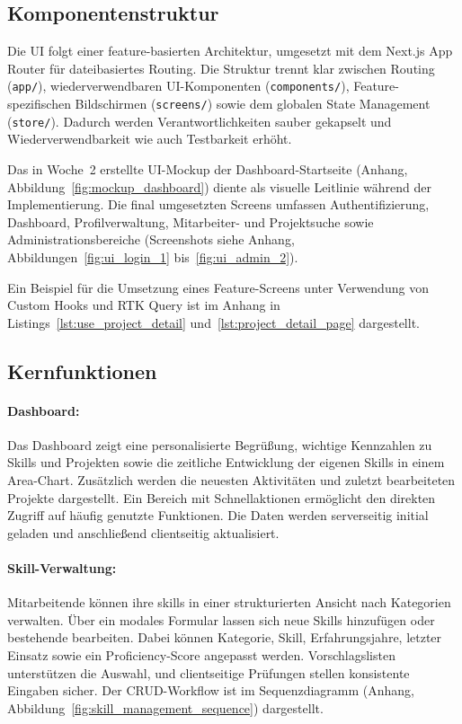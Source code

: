\subsection{Komponentenstruktur}

Die UI folgt einer feature-basierten Architektur\cite{atomic_design}, umgesetzt mit dem Next.js App Router für dateibasiertes Routing. Die Struktur trennt klar zwischen Routing (\texttt{app/}), wiederverwendbaren UI-Komponenten (\texttt{components/}), Feature-spezifischen Bildschirmen (\texttt{screens/}) sowie dem globalen State Management (\texttt{store/}). Dadurch werden Verantwortlichkeiten sauber gekapselt und Wiederverwendbarkeit wie auch Testbarkeit erhöht.

Das in Woche~2 erstellte UI-Mockup der Dashboard-Startseite (Anhang, Abbildung~\ref{fig:mockup_dashboard}) diente als visuelle Leitlinie während der Implementierung. Die final umgesetzten Screens umfassen Authentifizierung, Dashboard, Profilverwaltung, Mitarbeiter- und Projektsuche sowie Administrationsbereiche (Screenshots siehe Anhang, Abbildungen~\ref{fig:ui_login_1} bis~\ref{fig:ui_admin_2}).

Ein Beispiel für die Umsetzung eines Feature-Screens unter Verwendung von Custom Hooks und RTK Query ist im Anhang in Listings~\ref{lst:use_project_detail} und~\ref{lst:project_detail_page} dargestellt.

\subsection{Kernfunktionen}

\paragraph{Dashboard:}
Das Dashboard zeigt eine personalisierte Begrüßung, wichtige Kennzahlen zu Skills und Projekten sowie die zeitliche Entwicklung der eigenen Skills in einem Area-Chart. Zusätzlich werden die neuesten Aktivitäten und zuletzt bearbeiteten Projekte dargestellt. Ein Bereich mit Schnellaktionen ermöglicht den direkten Zugriff auf häufig genutzte Funktionen. Die Daten werden serverseitig initial geladen und anschließend clientseitig aktualisiert.

\paragraph{Skill-Verwaltung:}
Mitarbeitende können ihre \glspl{skill} in einer strukturierten Ansicht nach Kategorien verwalten. Über ein modales Formular lassen sich neue Skills hinzufügen oder bestehende bearbeiten. 
Dabei können Kategorie, Skill, Erfahrungsjahre, letzter Einsatz sowie ein Proficiency-Score angepasst werden. Vorschlagslisten unterstützen die Auswahl, und clientseitige Prüfungen stellen konsistente Eingaben sicher. Der CRUD-Workflow ist im Sequenzdiagramm (Anhang, Abbildung~\ref{fig:skill_management_sequence}) dargestellt.

